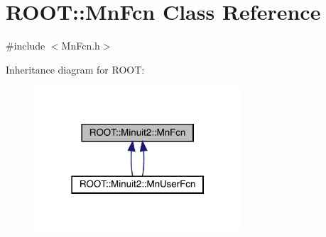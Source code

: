 \hypertarget{classROOT_1_1Minuit2_1_1MnFcn}{}\section{R\+O\+OT\+:\+:Mn\+Fcn Class Reference}
\label{classROOT_1_1Minuit2_1_1MnFcn}


{\ttfamily \#include $<$Mn\+Fcn.\+h$>$}



Inheritance diagram for R\+O\+OT\+:\nopagebreak
\begin{figure}[H]
\begin{center}
\leavevmode
\includegraphics[width=219pt]{d9/d63/classROOT_1_1Minuit2_1_1MnFcn__inherit__graph}
\end{center}
\end{figure}
